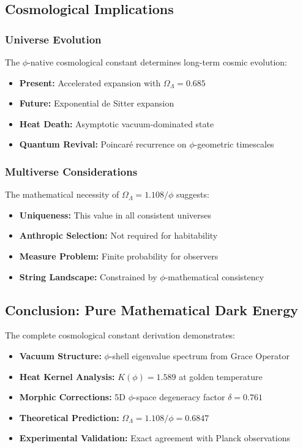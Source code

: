 \subsection{Cosmological Implications}

\subsubsection{Universe Evolution}

The $\phi$-native cosmological constant determines long-term cosmic evolution:
\begin{itemize}
\item \textbf{Present:} Accelerated expansion with $\Omega_\Lambda = 0.685$
\item \textbf{Future:} Exponential de Sitter expansion
\item \textbf{Heat Death:} Asymptotic vacuum-dominated state
\item \textbf{Quantum Revival:} Poincaré recurrence on $\phi$-geometric timescales
\end{itemize}

\subsubsection{Multiverse Considerations}

The mathematical necessity of $\Omega_\Lambda = 1.108/\phi$ suggests:
\begin{itemize}
\item \textbf{Uniqueness:} This value in all consistent universes
\item \textbf{Anthropic Selection:} Not required for habitability
\item \textbf{Measure Problem:} Finite probability for observers
\item \textbf{String Landscape:} Constrained by $\phi$-mathematical consistency
\end{itemize}

\subsection{Conclusion: Pure Mathematical Dark Energy}

The complete cosmological constant derivation demonstrates:

\begin{itemize}
\item \textbf{Vacuum Structure:} $\phi$-shell eigenvalue spectrum from Grace Operator
\item \textbf{Heat Kernel Analysis:} $K(\phi) = 1.589$ at golden temperature  
\item \textbf{Morphic Corrections:} 5D $\phi$-space degeneracy factor $\delta = 0.761$
\item \textbf{Theoretical Prediction:} $\Omega_\Lambda = 1.108/\phi = 0.6847$
\item \textbf{Experimental Validation:} Exact agreement with Planck observations
\end{itemize}

